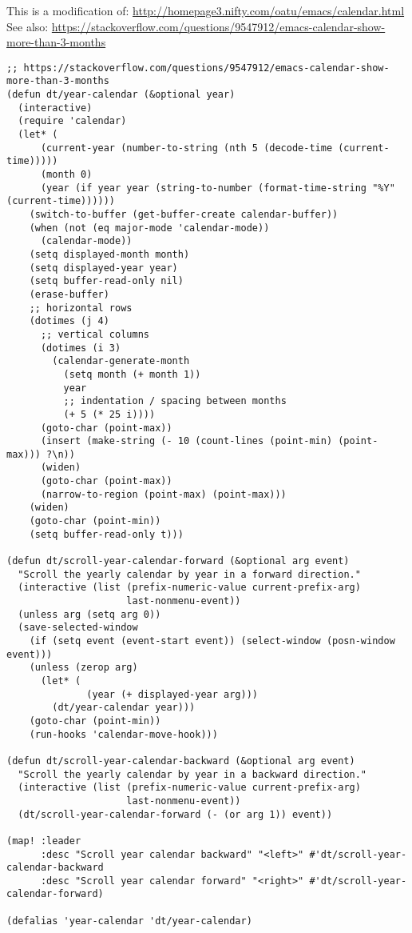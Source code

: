 \documentclass[11pt]{article}
\begin{document}
This is a modification of: \url{http://homepage3.nifty.com/oatu/emacs/calendar.html}
See also: \url{https://stackoverflow.com/questions/9547912/emacs-calendar-show-more-than-3-months}

\begin{verbatim}
;; https://stackoverflow.com/questions/9547912/emacs-calendar-show-more-than-3-months
(defun dt/year-calendar (&optional year)
  (interactive)
  (require 'calendar)
  (let* (
      (current-year (number-to-string (nth 5 (decode-time (current-time)))))
      (month 0)
      (year (if year year (string-to-number (format-time-string "%Y" (current-time))))))
    (switch-to-buffer (get-buffer-create calendar-buffer))
    (when (not (eq major-mode 'calendar-mode))
      (calendar-mode))
    (setq displayed-month month)
    (setq displayed-year year)
    (setq buffer-read-only nil)
    (erase-buffer)
    ;; horizontal rows
    (dotimes (j 4)
      ;; vertical columns
      (dotimes (i 3)
        (calendar-generate-month
          (setq month (+ month 1))
          year
          ;; indentation / spacing between months
          (+ 5 (* 25 i))))
      (goto-char (point-max))
      (insert (make-string (- 10 (count-lines (point-min) (point-max))) ?\n))
      (widen)
      (goto-char (point-max))
      (narrow-to-region (point-max) (point-max)))
    (widen)
    (goto-char (point-min))
    (setq buffer-read-only t)))

(defun dt/scroll-year-calendar-forward (&optional arg event)
  "Scroll the yearly calendar by year in a forward direction."
  (interactive (list (prefix-numeric-value current-prefix-arg)
                     last-nonmenu-event))
  (unless arg (setq arg 0))
  (save-selected-window
    (if (setq event (event-start event)) (select-window (posn-window event)))
    (unless (zerop arg)
      (let* (
              (year (+ displayed-year arg)))
        (dt/year-calendar year)))
    (goto-char (point-min))
    (run-hooks 'calendar-move-hook)))

(defun dt/scroll-year-calendar-backward (&optional arg event)
  "Scroll the yearly calendar by year in a backward direction."
  (interactive (list (prefix-numeric-value current-prefix-arg)
                     last-nonmenu-event))
  (dt/scroll-year-calendar-forward (- (or arg 1)) event))

(map! :leader
      :desc "Scroll year calendar backward" "<left>" #'dt/scroll-year-calendar-backward
      :desc "Scroll year calendar forward" "<right>" #'dt/scroll-year-calendar-forward)

(defalias 'year-calendar 'dt/year-calendar)
\end{verbatim}
\end{document}
